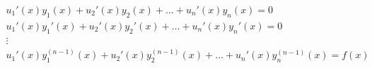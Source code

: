 \documentclass[preview]{standalone}
\begin{document}
\begin{align*}
u_1'(x)y_1(x) + u_2'(x)y_2(x) + \dots + u_n'(x)y_n(x) = 0 \\
            u_1'(x)y_1'(x) + u_2'(x)y_2'(x) + \dots + u_n'(x)y_n'(x) = 0 \\
            \vdots \\
            u_1'(x)y_1^{(n-1)}(x) + u_2'(x)y_2^{(n-1)}(x) + \dots + u_n'(x)y_n^{(n-1)}(x) = f(x)
\end{align*}
\end{document}
